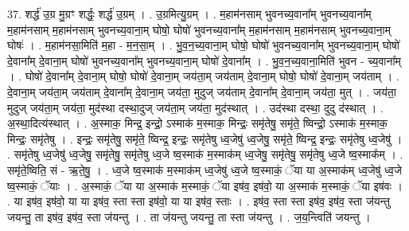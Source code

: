 \documentclass[17pt]{extarticle}
\begin{document}
37. शर्द्ध॑ उ॒ग्र मु॒ग्रꣳ शर्द्धः॒ शर्द्ध॑ उ॒ग्रम् । . उ॒ग्रमित्यु॒ग्रम् । . म॒हाम॑नसाम् भुवनच्य॒वाना᳚म् भुवनच्य॒वाना᳚म् म॒हाम॑नसाम् म॒हाम॑नसाम् भुवनच्य॒वाना॒म् घोषो॒ घोषो॑ भुवनच्य॒वाना᳚म् म॒हाम॑नसाम् म॒हाम॑नसाम् भुवनच्य॒वाना॒म् घोषः॑ । . म॒हाम॑नसा॒मिति॑ म॒हा - म॒न॒सा॒म् । . भु॒व॒न॒च्य॒वाना॒म् घोषो॒ घोषो॑ भुवनच्य॒वाना᳚म् भुवनच्य॒वाना॒म् घोषो॑ दे॒वाना᳚म् दे॒वाना॒म् घोषो॑ भुवनच्य॒वाना᳚म् भुवनच्य॒वाना॒म् घोषो॑ दे॒वाना᳚म् । . भु॒व॒न॒च्य॒वाना॒मिति॑ भुवन - च्य॒वाना᳚म् । . घोषो॑ दे॒वाना᳚म् दे॒वाना॒म् घोषो॒ घोषो॑ दे॒वाना॒म् जय॑ता॒म् जय॑ताम् दे॒वाना॒म् घोषो॒ घोषो॑ दे॒वाना॒म् जय॑ताम् । . दे॒वाना॒म् जय॑ता॒म् जय॑ताम् दे॒वाना᳚म् दे॒वाना॒म् जय॑ता॒ मुदुज् जय॑ताम् दे॒वाना᳚म् दे॒वाना॒म् जय॑ता॒ मुत् । . जय॑ता॒ मुदुज् जय॑ता॒म् जय॑ता॒ मुद॑स्था दस्था॒दुज् जय॑ता॒म् जय॑ता॒ मुद॑स्थात् । . उद॑स्था दस्था॒ दुदु द॑स्थात् । . अ॒स्था॒दित्य॑स्थात् । . अ॒स्माक॒ मिन्द्र॒ इन्द्रो॒ ऽस्माक॑ म॒स्माक॒ मिन्द्रः॒ समृ॑तेषु॒ समृ॑ते॒ ष्विन्द्रो॒ ऽस्माक॑ म॒स्माक॒ मिन्द्रः॒ समृ॑तेषु । . इन्द्रः॒ समृ॑तेषु॒ समृ॑ते॒ ष्विन्द्र॒ इन्द्रः॒ समृ॑तेषु ध्व॒जेषु॑ ध्व॒जेषु॒ समृ॑ते॒ ष्विन्द्र॒ इन्द्रः॒ समृ॑तेषु ध्व॒जेषु॑ । . समृ॑तेषु ध्व॒जेषु॑ ध्व॒जेषु॒ समृ॑तेषु॒ समृ॑तेषु ध्व॒जे ष्व॒स्माक॑ म॒स्माक॑म् ध्व॒जेषु॒ समृ॑तेषु॒ समृ॑तेषु ध्व॒जे ष्व॒स्माक᳚म् । . समृ॑ते॒ष्विति॒ सं - ऋ॒ते॒षु॒ । . ध्व॒जे ष्व॒स्माक॑ म॒स्माक॑म् ध्व॒जेषु॑ ध्व॒जे ष्व॒स्माकं॒ ॅया या अ॒स्माक॑म् ध्व॒जेषु॑ ध्व॒जे ष्व॒स्माकं॒ ॅयाः । . अ॒स्माकं॒ ॅया या अ॒स्माक॑ म॒स्माकं॒ ॅया इष॑व॒ इष॑वो॒ या अ॒स्माक॑ म॒स्माकं॒ ॅया इष॑वः । . या इष॑व॒ इष॑वो॒ या या इष॑व॒ स्ता स्ता इष॑वो॒ या या इष॑व॒ स्ताः । . इष॑व॒ स्ता स्ता इष॑व॒ इष॑व॒ स्ता ज॑यन्तु जयन्तु॒ ता इष॑व॒ इष॑व॒ स्ता ज॑यन्तु । . ता ज॑यन्तु जयन्तु॒ ता स्ता ज॑यन्तु । . ज॒य॒न्त्विति॑ जयन्तु । \newline
\pagebreak
{}
\end{document}
